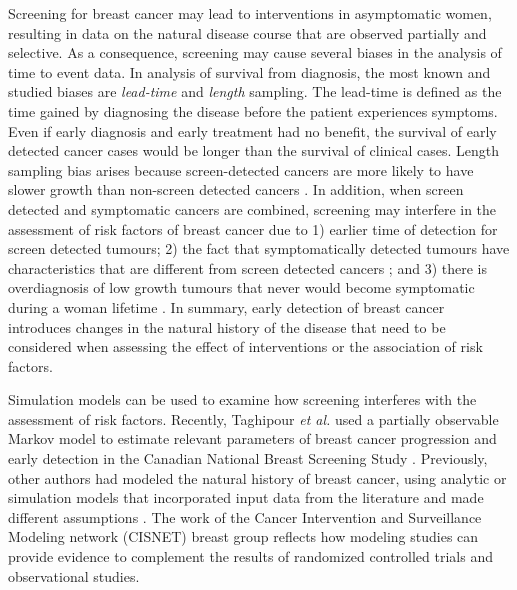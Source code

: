 \documentclass{bmcart}
\begin{document}
Screening for breast cancer may lead to interventions in asymptomatic women, resulting in data on
the natural disease course that are observed partially and selective. As a consequence, screening
may cause several biases in the analysis of time to event data. In analysis of survival from
diagnosis, the most known and studied biases are \textit{lead-time} and \textit{length} sampling.
The lead-time is defined as the time gained by diagnosing the disease before the patient
experiences symptoms. Even if early diagnosis and early treatment had no benefit, the survival of
early detected cancer cases would be longer than the survival of clinical cases. Length sampling
bias arises because screen-detected cancers are more likely to have slower growth than non-screen
detected cancers \cite{Zelen1969}. In addition, when screen detected and symptomatic cancers are
combined, screening may interfere in the assessment of risk factors of breast cancer due to 1)
earlier time of detection for screen detected tumours; 2) the fact that symptomatically detected
tumours have characteristics that are different from screen detected cancers \cite{Blanch2014}; and
3) there is overdiagnosis of low growth tumours that never would become symptomatic during a woman
lifetime \cite{Esserman2013a}. In summary, early detection of breast cancer introduces changes in
the natural history of the disease that need to be considered when assessing the effect of
interventions or the association of risk factors.

Simulation models can be used to examine how screening interferes with the assessment of risk
factors. Recently, Taghipour \textit{et al.} used a partially observable Markov model to estimate
relevant parameters of breast cancer progression and early detection in the Canadian National
Breast Screening Study \cite{Taghipour2013}. Previously, other authors had modeled the natural
history of breast cancer, using analytic or simulation models that incorporated input data from the
literature and made different assumptions \cite{Zelen1969, Chen1996, Shen2001, Lee2003b, Berry2006,
Fryback2006, Hanin2006, Lee2006, Mandelblatt2006, Plevritis2006, Weedon-Fekjaer2008a}. The work of
the Cancer Intervention and Surveillance Modeling network (CISNET) breast group \cite{Berry2006,
Fryback2006, Hanin2006, Lee2006, Mandelblatt2006, Plevritis2006} reflects how modeling studies can
provide evidence to complement the results of randomized controlled trials and observational
studies.
\end{document}
